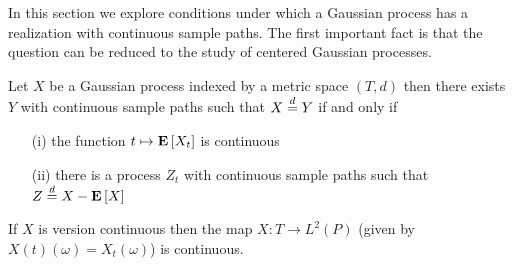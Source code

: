 In this section we explore conditions under which a Gaussian process has a realization with continuous sample paths.  The first important fact is that the question can be reduced to the study of centered Gaussian processes.
\begin{thm}\label{GaussianVersionContinuityCentering}Let $X$ be a Gaussian process indexed by a metric space $(T,d)$ then there exists $Y$ with continuous sample paths such that $X \overset{d}= Y$ if and only if 
\begin{itemize}
\item[(i)] the function $t \mapsto \textbf{E}\left[X_t\right]$ is continuous
\item[(ii)] there is a process $Z_t$ with continuous sample paths such that $Z \overset{d}= X - \textbf{E}\left[X\right]$ 
\end{itemize}
If $X$ is version continuous then the map $X : T \to L^2(P)$ (given by $X (t)(\omega) = X_t(\omega)$) is continuous.
\end{thm}
